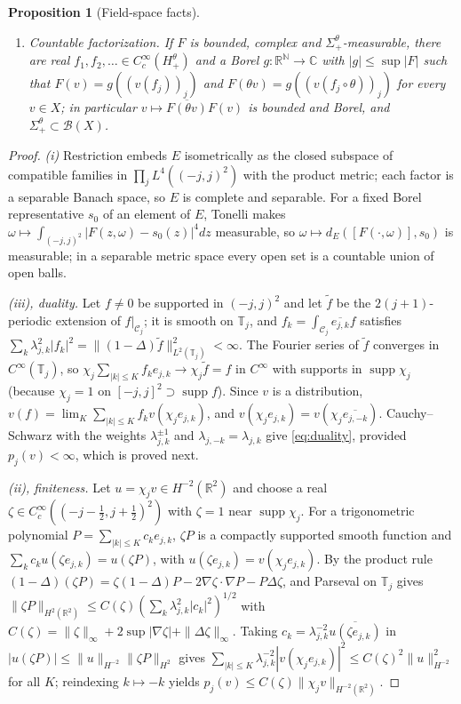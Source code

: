 \documentclass[11pt]{article}
\theoremstyle{plain}
\newtheorem{proposition}[theorem]{Proposition}
\theoremstyle{definition}
\theoremstyle{remark}
\newcommand{\R}{\mathbb{R}}
\newcommand{\C}{\mathbb{C}}
\newcommand{\N}{\mathbb{N}}
\newcommand{\Q}{\mathbb{Q}}
\newcommand{\T}{\mathbb{T}}
\newcommand{\cB}{\mathcal{B}}
\newcommand{\cC}{\mathcal{C}}
\newcommand{\cD}{\mathcal{D}}
\newcommand{\conj}[1]{\overline{#1}}
\DeclareMathOperator{\supp}{supp}
\begin{document}
\begin{proposition}[Field-space facts]
\begin{enumerate}[label=(\roman*)]
  imaginary parts of $\chi_nP$, $n\ge1$, $P$ a trigonometric polynomial on $\T_n$
  with coefficients in $\Q+i\Q$. Two real distributions that agree on $\cD_0$ are
  equal.
\item \emph{Countable factorization.} If $F$ is bounded, complex and
  $\Sigma^{\theta}_{+}$-measurable, there are real $f_1,f_2,\dots\in C_c^{\infty}(H^{\theta}_{+})$
  and a Borel $g:\R^{\N}\to\C$ with $|g|\le\sup|F|$ such that $F(v)=g((v(f_j))_j)$ and
  $F(\theta v)=g((v(f_j\circ\theta))_j)$ for every $v\in X$; in particular
  $v\mapsto\conj{F(\theta v)}F(v)$ is bounded and Borel, and
  $\Sigma^{\theta}_{+}\subset\cB(X)$.
\end{enumerate}
\end{proposition}

\begin{proof}
\emph{(i)} Restriction embeds $E$ isometrically as the closed subspace of compatible
families in $\prod_jL^{4}((-j,j)^{2})$ with the product metric; each factor is a
separable Banach space, so $E$ is complete and separable. For a fixed Borel
representative $s_0$ of an element of $E$, Tonelli makes
$\omega\mapsto\int_{(-j,j)^{2}}|F(z,\omega)-s_0(z)|^{4}dz$ measurable, so
$\omega\mapsto d_E([F(\cdot,\omega)],s_0)$ is measurable; in a separable metric space
every open set is a countable union of open balls.

\emph{(iii), duality.} Let $f\ne0$ be supported in $(-j,j)^{2}$ and let $\tilde f$
be the $2(j+1)$-periodic extension of $f|_{\cC_j}$; it is smooth on $\T_j$, and
$f_k=\int_{\cC_j}\conj{e_{j,k}}f$ satisfies $\sum_k\lambda_{j,k}^{2}|f_k|^{2}=\|(1-\Delta)\tilde f\|^{2}_{L^{2}(\T_j)}<\infty$.
The Fourier series of $\tilde f$ converges in $C^{\infty}(\T_j)$, so
$\chi_j\sum_{|k|\le K}f_ke_{j,k}\to\chi_j\tilde f=f$ in $C^{\infty}$ with supports in
$\supp\chi_j$ (because $\chi_j=1$ on $[-j,j]^{2}\supset\supp f$). Since $v$ is a
distribution, $v(f)=\lim_K\sum_{|k|\le K}f_kv(\chi_je_{j,k})$, and
$v(\chi_je_{j,k})=v(\chi_j\conj{e_{j,-k}})$. Cauchy--Schwarz with the weights
$\lambda_{j,k}^{\pm1}$ and $\lambda_{j,-k}=\lambda_{j,k}$ give \eqref{eq:duality},
provided $p_j(v)<\infty$, which is proved next.

\emph{(ii), finiteness.} Let $u=\chi_jv\in H^{-2}(\R^{2})$ and choose a real
$\zeta\in C_c^{\infty}((-j-\tfrac12,j+\tfrac12)^{2})$ with $\zeta=1$ near $\supp\chi_j$. For a
trigonometric polynomial $P=\sum_{|k|\le K}c_ke_{j,k}$, $\zeta P$ is a compactly
supported smooth function and $\sum_kc_ku(\zeta e_{j,k})=u(\zeta P)$, with
$u(\zeta e_{j,k})=v(\chi_je_{j,k})$. By the product rule
$(1-\Delta)(\zeta P)=\zeta(1-\Delta)P-2\nabla\zeta\cdot\nabla P-P\Delta\zeta$, and Parseval on
$\T_j$ gives $\|\zeta P\|_{H^{2}(\R^{2})}\le C(\zeta)(\sum_k\lambda_{j,k}^{2}|c_k|^{2})^{1/2}$
with $C(\zeta)=\|\zeta\|_\infty+2\sup|\nabla\zeta|+\|\Delta\zeta\|_\infty$. Taking
$c_k=\lambda_{j,k}^{-2}\conj{u(\zeta e_{j,k})}$ in
$|u(\zeta P)|\le\|u\|_{H^{-2}}\|\zeta P\|_{H^{2}}$ gives
$\sum_{|k|\le K}\lambda_{j,k}^{-2}|v(\chi_je_{j,k})|^{2}\le C(\zeta)^{2}\|u\|^{2}_{H^{-2}}$ for all
$K$; reindexing $k\mapsto-k$ yields $p_j(v)\le C(\zeta)\|\chi_jv\|_{H^{-2}(\R^{2})}$.


\end{proof}
\end{document}
